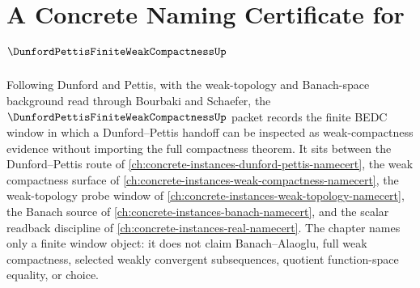 \chapter{A Concrete Naming Certificate for $\DunfordPettisFiniteWeakCompactnessUp$}
\label{ch:concrete-instances-dunford-pettis-finite-weak-compactness-namecert}

Following Dunford and Pettis, with the weak-topology and Banach-space background read through Bourbaki and Schaefer, the $\DunfordPettisFiniteWeakCompactnessUp$ packet records the finite BEDC window in which a Dunford--Pettis handoff can be inspected as weak-compactness evidence without importing the full compactness theorem. It sits between the Dunford--Pettis route of \autoref{ch:concrete-instances-dunford-pettis-namecert}, the weak compactness surface of \autoref{ch:concrete-instances-weak-compactness-namecert}, the weak-topology probe window of \autoref{ch:concrete-instances-weak-topology-namecert}, the Banach source of \autoref{ch:concrete-instances-banach-namecert}, and the scalar readback discipline of \autoref{ch:concrete-instances-real-namecert}. The chapter names only a finite window object: it does not claim Banach--Alaoglu, full weak compactness, selected weakly convergent subsequences, quotient function-space equality, or choice.

